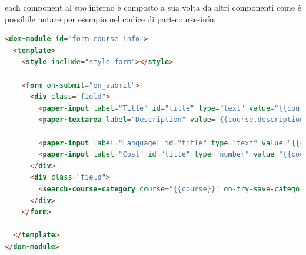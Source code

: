 each component al suo interno è composto a sua volta da altri componenti come è possibile notare per esempio nel codice di part-course-info:

\begin{lstlisting}[language=html]
<dom-module id="form-course-info">
  <template>
    <style include="style-form"></style>

    <form on-submit="on_submit">
      <div class="field">
        <paper-input label="Title" id="title" type="text" value="{{course.title}}"></paper-input>
        <paper-textarea label="Description" value="{{course.description}}"></paper-textarea>
      
        <paper-input label="Language" id="title" type="text" value="{{course.language}}"></paper-input>
        <paper-input label="Cost" id="title" type="number" value="{{course.cost}}"></paper-input>
      </div>
      <div class="field">
        <search-course-category course="{{course}}" on-try-save-categories="on_try_save_categories" on-try-delete-category="on_try_delete_category"></search-course-category>
      </div>
    </form>

  </template>
</dom-module>
\end{lstlisting}








